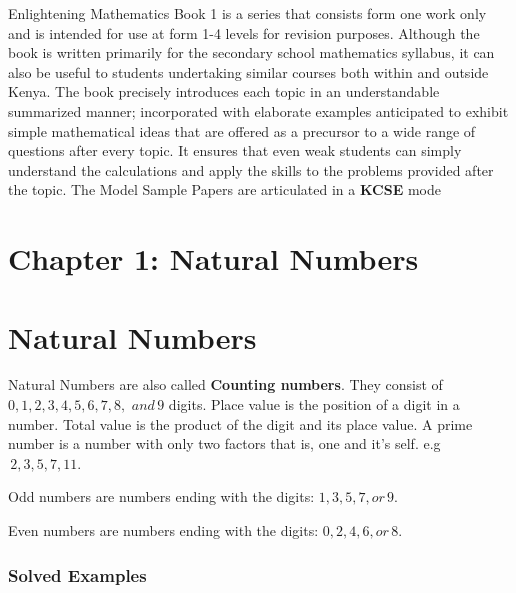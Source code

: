 \documentclass[
  a4paperpaper,
]{scrbook}
\begin{document}
Enlightening Mathematics Book 1 is a series that consists form one work
only and is intended for use at form 1-4 levels for revision purposes.
Although the book is written primarily for the secondary school
mathematics syllabus, it can also be useful to students undertaking
similar courses both within and outside Kenya. The book precisely
introduces each topic in an understandable summarized manner;
incorporated with elaborate examples anticipated to exhibit simple
mathematical ideas that are offered as a precursor to a wide range of
questions after every topic. It ensures that even weak students can
simply understand the calculations and apply the skills to the problems
provided after the topic. The Model Sample Papers are articulated in a
\textbf{KCSE} mode


\hypertarget{chapter-1-natural-numbers}{%
\chapter{Chapter 1: Natural Numbers}\label{chapter-1-natural-numbers}}


\hypertarget{natural-numbers}{%
\chapter*{Natural Numbers}\label{natural-numbers}}


Natural Numbers are also called \textbf{Counting numbers}. They consist
of \(0, 1, 2, 3, 4, 5, 6, 7, 8,\) \(and\, 9\) digits. Place value is the
position of a digit in a number. Total value is the product of the digit
and its place value. A prime number is a number with only two factors
that is, one and it's self. e.g \(\,2, 3, 5, 7, 11.\)

Odd numbers are numbers ending with the digits: \(1, 3, 5, 7, or \,9.\)

Even numbers are numbers ending with the digits: \(0, 2, 4, 6, or\, 8.\)

\hypertarget{solved-examples}{%
\subsection{Solved Examples}\label{solved-examples}}
\end{document}
